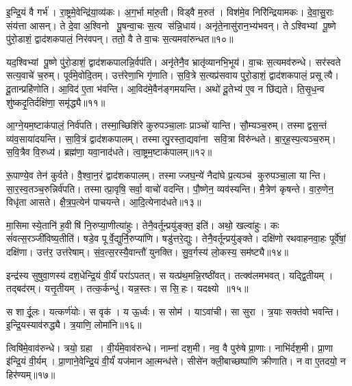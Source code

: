 इ॒न्द्रि॒यं वै गर्भ॑।
रा॒ष्ट्रमे॒वेन्द्रि॑या॒व्य॑कः।
अ॒ग॒र्भा मा॑रु॒ती।
विड्वै म॒रुत॑।
विश॑मे॒व निरि॑न्द्रियामकः।
दे॒वा॒सु॒राः संय॑त्ता आसन्।
ते दे॒वा अ॒श्विनो पू॒षन्वा॒चः स॒त्य स॑न्नि॒धाय॑।
अनृ॑ते॒नासु॑रान॒भ्य॑भवन्।
तेऽश्विभ्यां पू॒ष्णे पु॑रो॒डाशं॒ द्वाद॑शकपालं॒ निर॑वपन्।
ततो॒ वै ते वा॒चः स॒त्यमवा॑रुन्धत॥१०॥

यद॒श्विभ्यां पू॒ष्णे पु॑रो॒डाशं॒ द्वाद॑शकपालन्नि॒र्वप॑ति।
अनृ॑तेनै॒व भ्रातृ॑व्यानभि॒भूय॑।
वा॒चः स॒त्यमव॑रुन्धे।
सर॑स्वते सत्य॒वाचे॑ च॒रुम्।
पूर्व॑मे॒वोदि॒तम्।
उत्त॑रेणा॒भि गृ॑णाति।
स॒वि॒त्रे स॒त्यप्र॑सवाय पुरो॒डाशं॒ द्वाद॑शकपालं॒ प्रसूत्यै।
दू॒तान्प्रहि॑णोति।
आ॒विद॑ ए॒ता भ॑वन्ति।
आ॒विद॑मे॒वैन॑ङ्गमयन्ति।
अथो॑ दू॒तेभ्य॑ ए॒व न छि॑द्यते।
ति॒सृ॒ध॒न्व शु॑ष्कदृ॒तिर्दक्षि॑णा॒ समृ॑द्ध्यै॥११॥\anuvakamend[अ॒र्ध॒य॒ति॒ भ॒व॒त्य॒रु॒न्ध॒त॒ ग॒म॒य॒न्ति॒ द्वे च॑]

आ॒ग्ने॒यम॒ष्टाक॑पालं॒ निर्व॑पति।
तस्मा॒च्छिशि॑रे कुरुपञ्चा॒लाः प्राञ्चो॑ यान्ति।
सौ॒म्यञ्च॒रुम्।
तस्माद्वस॒न्तं व्य॑व॒साया॑दयन्ति।
सा॒वि॒त्रं द्वाद॑शकपालम्।
तस्मात्पु॒रस्ता॒द्यवा॑ना सवि॒त्रा विरु॑न्धते।
बा॒र्॒ह॒स्प॒त्यञ्च॒रुम्।
स॒वि॒त्रैव वि॒रुध्य॑।
ब्रह्म॑णा॒ यवा॒नाद॑धते।
त्वा॒ष्ट्रम॒ष्टाक॑पालम्॥१२॥

रू॒पाण्ये॒व तेन॑ कुर्वते।
वै॒श्वा॒न॒रं द्वाद॑शकपालम्।
तस्माज्जघ॒न्ये॑ नैदा॑घे प्र॒त्यञ्च॑ कुरुपञ्चा॒ला यान्ति।
सा॒र॒स्व॒तञ्च॒रुन्निर्व॑पति।
तस्मात्प्रा॒वृषि॒ सर्वा॒ वाचो॑ वदन्ति।
पौ॒ष्णेन॒ व्यव॑स्यन्ति।
मै॒त्रेण॑ कृषन्ते।
वा॒रु॒णेन॒ विधृ॑ता आसते।
क्षै॒त्र॒प॒त्येन॑ पाचयन्ते।
आ॒दि॒त्येनाद॑धते॥१३॥

मा॒सिमास्ये॒तानि॑ ह॒वीषि॑ नि॒रुप्या॒णीत्या॑हुः।
तेनै॒वर्तून्प्रयु॑ङ्क्त॒ इति॑।
अथो॒ खल्वा॑हुः।
कः सं॑वत्स॒रञ्जी॑विष्य॒तीति॑।
षडे॒व पूर्वे॒द्युर्नि॒रुप्या॑णि।
षडु॑त्तरे॒द्युः।
तेनै॒वर्तून्प्रयु॑ङ्क्ते।
दक्षि॑णो रथवाहनवा॒हः पूर्वे॑षां॒ दक्षि॑णा।
उत्त॑र॒ उत्त॑रेषाम्।
सं॒व॒त्स॒रस्यै॒वान्तौ॑ युनक्ति।
सु॒व॒र्गस्य॑ लो॒कस्य॒ सम॑ष्ट्यै॥१४॥\anuvakamend[त्वा॒ष्ट्रम॒ष्टाक॑पालन्दधते युन॒क्त्येकं॑ च]

इन्द्र॑स्य सुषुवा॒णस्य॑ दश॒धेन्द्रि॒यं वी॒र्यं॑ परा॑ऽपतत्।
स यत्प्र॑थ॒मन्नि॒रष्ठी॑वत्।
तत्क्व॑लमभवत्।
यद्द्वि॒तीयम्।
तद्बद॑रम्।
यत्तृ॒तीयम्।
तत्क॒र्कन्धु॑।
यन्न॒स्तः।
स सि॒हः।
यदक्ष्यो॥१५॥

स शार्दू॒लः।
यत्कर्ण॑योः।
स वृक॑।
य ऊ॒र्ध्वः।
स सोम॑।
याऽवा॑ची।
सा सुरा।
त्र॒याः सक्त॑वो भवन्ति।
इ॒न्द्रि॒यस्याव॑रुद्ध्यै।
त्र॒याणि॒ लोमा॑नि॥१६॥

त्विषि॑मे॒वाव॑रुन्धे।
त्रयो॒ ग्रहा।
वी॒र्य॑मे॒वाव॑रुन्धे।
नाम्ना॑ दश॒मी।
नव॒ वै पुरु॑षे प्रा॒णाः।
नाभि॑र्दश॒मी।
प्रा॒णा इ॑न्द्रि॒यं वी॒र्यम्।
प्रा॒णाने॒वेन्द्रि॒यं वी॒र्यं॑ यज॑मान आ॒त्मन्ध॑त्ते।
सीसे॑न क्ली॒बाच्छष्पा॑णि क्रीणाति।
न वा ए॒तदयो॒ न हिर॑ण्यम्॥१७॥

